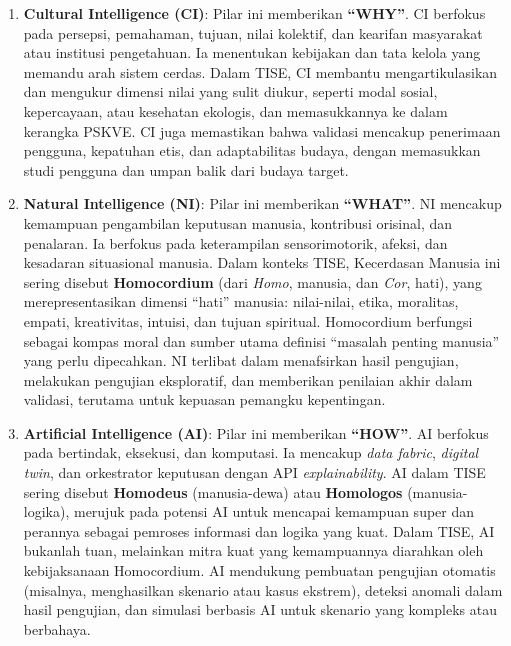 \documentclass[
  letterpaper,
  DIV=11,
  numbers=noendperiod]{scrreprt}
\begin{document}
\begin{enumerate}
\def\labelenumi{\arabic{enumi}.}
\item
  \textbf{Cultural Intelligence (CI)}: Pilar ini memberikan
  \textbf{``WHY''}. CI berfokus pada persepsi, pemahaman, tujuan, nilai
  kolektif, dan kearifan masyarakat atau institusi pengetahuan. Ia
  menentukan kebijakan dan tata kelola yang memandu arah sistem cerdas.
  Dalam TISE, CI membantu mengartikulasikan dan mengukur dimensi nilai
  yang sulit diukur, seperti modal sosial, kepercayaan, atau kesehatan
  ekologis, dan memasukkannya ke dalam kerangka PSKVE. CI juga
  memastikan bahwa validasi mencakup penerimaan pengguna, kepatuhan
  etis, dan adaptabilitas budaya, dengan memasukkan studi pengguna dan
  umpan balik dari budaya target.
\item
  \textbf{Natural Intelligence (NI)}: Pilar ini memberikan
  \textbf{``WHAT''}. NI mencakup kemampuan pengambilan keputusan
  manusia, kontribusi orisinal, dan penalaran. Ia berfokus pada
  keterampilan sensorimotorik, afeksi, dan kesadaran situasional
  manusia. Dalam konteks TISE, Kecerdasan Manusia ini sering disebut
  \textbf{Homocordium} (dari \emph{Homo}, manusia, dan \emph{Cor},
  hati), yang merepresentasikan dimensi ``hati'' manusia: nilai-nilai,
  etika, moralitas, empati, kreativitas, intuisi, dan tujuan spiritual.
  Homocordium berfungsi sebagai kompas moral dan sumber utama definisi
  ``masalah penting manusia'' yang perlu dipecahkan. NI terlibat dalam
  menafsirkan hasil pengujian, melakukan pengujian eksploratif, dan
  memberikan penilaian akhir dalam validasi, terutama untuk kepuasan
  pemangku kepentingan.
\item
  \textbf{Artificial Intelligence (AI)}: Pilar ini memberikan
  \textbf{``HOW''}. AI berfokus pada bertindak, eksekusi, dan komputasi.
  Ia mencakup \emph{data fabric}, \emph{digital twin}, dan orkestrator
  keputusan dengan API \emph{explainability}. AI dalam TISE sering
  disebut \textbf{Homodeus} (manusia-dewa) atau \textbf{Homologos}
  (manusia-logika), merujuk pada potensi AI untuk mencapai kemampuan
  super dan perannya sebagai pemroses informasi dan logika yang kuat.
  Dalam TISE, AI bukanlah tuan, melainkan mitra kuat yang kemampuannya
  diarahkan oleh kebijaksanaan Homocordium. AI mendukung pembuatan
  pengujian otomatis (misalnya, menghasilkan skenario atau kasus
  ekstrem), deteksi anomali dalam hasil pengujian, dan simulasi berbasis
  AI untuk skenario yang kompleks atau berbahaya.
\end{enumerate}
\end{document}
